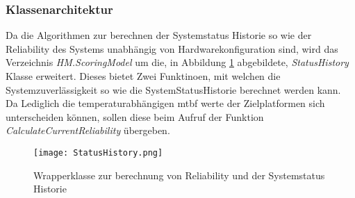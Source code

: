 \subsubsection*{Klassenarchitektur}
Da die Algorithmen zur berechnen der Systemstatus Historie so wie der Reliability des Systems unabhängig von Hardwarekonfiguration sind, wird das Verzeichnis \textit{HM.ScoringModel} um die, in Abbildung \ref{fig:SystemHistoryWrapper} abgebildete, \textit{StatusHistory} Klasse erweitert. Dieses bietet Zwei Funktinoen, mit welchen die Systemzuverlässigkeit so wie die SystemStatusHistorie berechnet werden kann. Da Lediglich die temperaturabhängigen \ac{mtbf} werte der Zielplatformen sich unterscheiden können, sollen diese beim Aufruf der Funktion \textit{CalculateCurrentReliability} übergeben. 
\begin{center}
    \begin{figure}[h!]
        \centering
        \texttt{[image: StatusHistory.png]}
        \caption{Wrapperklasse zur berechnung von Reliability und der Systemstatus Historie}
        \label{fig:SystemHistoryWrapper}
    \end{figure}
\end{center}
\vspace{-0.5cm}
